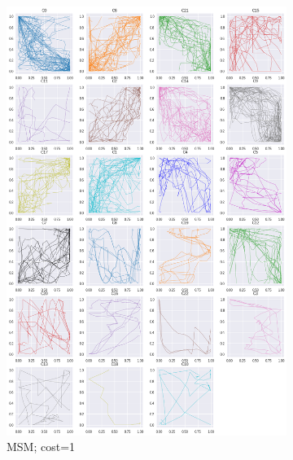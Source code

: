 \begin{figure}[h]
\begin{subfigure}[c]{0.3\linewidth}
     \includegraphics[width=\linewidth]{figs/clusters/CLU_H_ALL[MSM;c=1].png}
    \caption{MSM; cost=1}
  \end{subfigure}
  \hspace{.5em}
    \begin{subfigure}[c]{0.3\linewidth}

\end{subfigure}
\end{figure}
